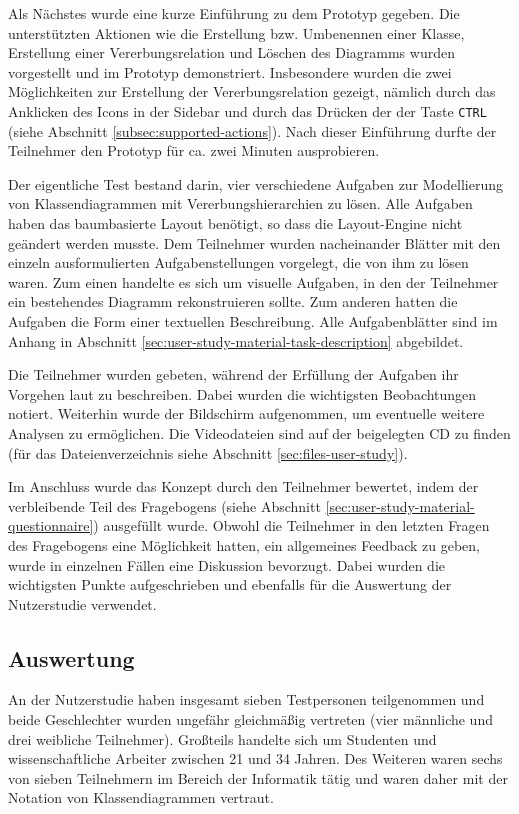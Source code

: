 Als Nächstes wurde eine kurze Einführung zu dem Prototyp gegeben. Die unterstützten Aktionen wie die Erstellung bzw. Umbenennen einer Klasse, Erstellung einer Vererbungsrelation und Löschen des Diagramms wurden vorgestellt und im Prototyp demonstriert. Insbesondere wurden die zwei Möglichkeiten zur Erstellung der Vererbungsrelation gezeigt, nämlich durch das Anklicken des Icons in der Sidebar und durch das Drücken der der Taste \texttt{CTRL} (siehe Abschnitt \ref{subsec:supported-actions}). Nach dieser Einführung durfte der Teilnehmer den Prototyp für ca. zwei Minuten ausprobieren.

Der eigentliche Test bestand darin, vier verschiedene Aufgaben zur Modellierung von Klassendiagrammen mit Vererbungshierarchien zu lösen. Alle Aufgaben haben das baumbasierte Layout benötigt, so dass die Lay\-out-Engine nicht geändert werden musste. Dem Teilnehmer wurden nacheinander Blätter mit den einzeln ausformulierten Aufgabenstellungen vorgelegt, die von ihm zu lösen waren. Zum einen handelte es sich um visuelle Aufgaben, in den der Teilnehmer ein bestehendes Diagramm rekonstruieren sollte. Zum anderen hatten die Aufgaben die Form einer textuellen Beschreibung. Alle Aufgabenblätter sind im Anhang in Abschnitt \ref{sec:user-study-material-task-description} abgebildet.

Die Teilnehmer wurden gebeten, während der Erfüllung der Aufgaben ihr Vorgehen laut zu beschreiben. Dabei wurden die wichtigsten Beobachtungen notiert. Weiterhin wurde der Bildschirm aufgenommen, um eventuelle weitere Analysen zu ermöglichen. Die Videodateien sind auf der beigelegten CD zu finden (für das Dateienverzeichnis siehe Abschnitt \ref{sec:files-user-study}).

Im Anschluss wurde das Konzept durch den Teilnehmer bewertet, indem der verbleibende Teil des Fragebogens (siehe Abschnitt \ref{sec:user-study-material-questionnaire}) ausgefüllt wurde. Obwohl die Teilnehmer in den letzten Fragen des Fragebogens eine Möglichkeit hatten, ein allgemeines Feedback zu geben, wurde in einzelnen Fällen eine Diskussion bevorzugt. Dabei wurden die wichtigsten Punkte aufgeschrieben und ebenfalls für die Auswertung der Nutzerstudie verwendet.

\subsection{Auswertung}
\label{subsec:user-study-evaluation}

An der Nutzerstudie haben insgesamt sieben Testpersonen teilgenommen und beide Geschlechter wurden ungefähr gleichmäßig vertreten (vier männliche und drei weibliche Teilnehmer). Großteils handelte sich um Studenten und wissenschaftliche Arbeiter zwischen 21 und 34 Jahren. Des Weiteren waren sechs von sieben Teilnehmern im Bereich der Informatik tätig und waren daher mit der Notation von Klassendiagrammen vertraut.


